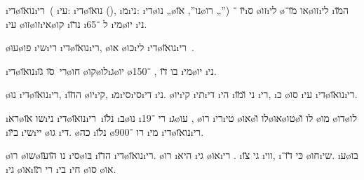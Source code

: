 \newcommand{\dinozaurim}{\i{די}\o{נו}\u{או}\i{רי}\x{ם}}

\dinozaurim\ ( \i{עי}: \i{די}\o{נו}\u{או} (), \i{מ}\i{ני}:  \i{די}\o{נו} „\o{נו}”,  \u{או}\o{רו} „”) \u{יו} ־\i{ס}  \o{זו}\i{לי} \o{או} \u{מו}־\o{זו}\i{לי} \i{ה}\u{מו} \i{עי} \o{זו}\o{זו}\i{אי}\o{קו} \i{נ}\u{דו} \i{ל} ־65 \i{מי}\o{יו} \i{ני}.

\o{עו}\o{פו}   \i{שי}\i{רי}  \dinozaurim, \o{או}  \o{כו}\i{לי}  \dinozaurim\ .

\dinozaurim\ \u{סו} \u{גו}\o{חו} \o{קו}\o{לו}\i{ג}\o{יו} \o{בו}   \u{דו} ,  ־150 \i{מי}\o{יו} \i{ני}.

\o{נו} \dinozaurim, \i{ה}\u{חו} \o{יו}\i{קי}, \i{מ}\i{סי}\i{סי}\i{די} \i{ני}. \o{יו}\i{קי} \i{תי}\i{די} \i{הי} \i{ני} \u{ו}\u{מו} \i{רי}, \i{כ}  \o{סו} \i{עי} \dinozaurim.

\i{רא}\o{שו} \u{או}\i{ני}  \dinozaurim\ \i{נ}\u{לו} \i{ב}\o{נו} \i{רי}   ־19   \i{ג}\o{עו} , \o{רו} \i{רי}\i{טי}  \o{או}\o{לו} \u{ו}\o{או}\o{טו}\o{לו} \u{ו} \o{מו} \o{דו}\o{לו} \i{ב}\u{יו} \i{שי}\i{יי} \o{גו}  \i{די}.
 \o{כה} \i{נ}\u{לו} \o{רו} ־900 \i{מי} \dinozaurim.

\o{רו} \o{שו}\o{נו} \u{הו}\u{עו}  \i{סי}\o{בּו} \i{ה}\u{דו}  \dinozaurim. \o{רו}  \i{היא} \i{גי} \o{או}\i{רי} . \i{גי}     \u{צו} \i{ווי},  \i{כּי}  \u{דו}־      \o{חו}\i{שי}. \i{ע}\o{בו} \i{גי} \o{או}\i{רי} \u{תו} \i{בי} \i{חי}  \o{סו} \o{או}.

